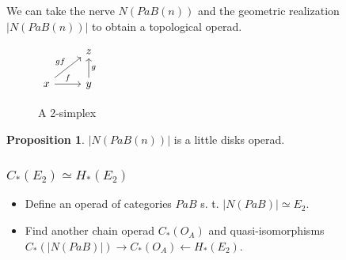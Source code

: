\documentclass{beamer}
\theoremstyle{definition}
\newtheorem{prop}[teorema]{Proposition}
\begin{document}
\begin{frame}[fragile]
 We can take the nerve $N(PaB(n))$ and the geometric realization $|N(PaB(n))|$ to obtain a topological operad. \pause %
 \begin{figure}
 $
 \begin{tikzcd}
 & z \\
 x\arrow[ur, "gf"]\arrow[r,"f"] & y\arrow[u, "g"']
 \end{tikzcd}
 $
 \caption{A 2-simplex}
 \end{figure}\pause
 
 \begin{prop}
 	$|N(PaB(n))|$ is a little disks operad.
 \end{prop}
\end{frame}

\begin{frame} 
\frametitle{$C_*(E_2)\simeq H_*(E_2)$}
	\begin{itemize}
	\item Define an operad of categories $PaB$ s. t. $|N(PaB)|\simeq E_2$. \checkmark
	\item Find another chain operad $C_*(O_A)$ and quasi-isomorphisms $C_*(|N(PaB)|)\to C_*(O_A)\leftarrow H_*(E_2)$. 
\end{itemize}%
\end{frame}
\end{document}
